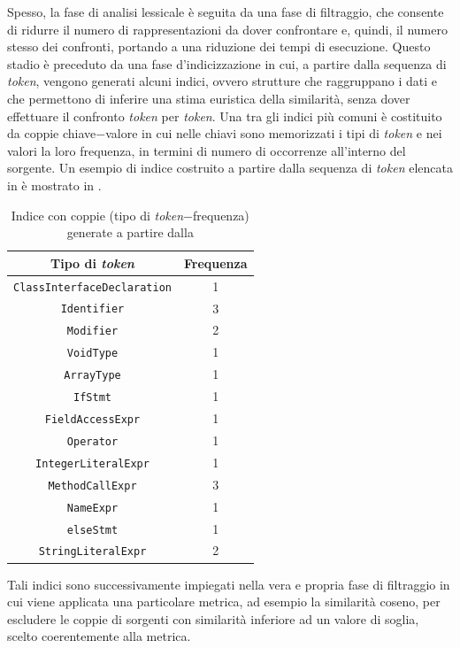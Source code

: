 Spesso, la fase di analisi lessicale è seguita da una fase di filtraggio, che consente di ridurre il numero di rappresentazioni da dover confrontare e, quindi, il numero stesso dei confronti, portando a una riduzione dei tempi di esecuzione.
%
Questo stadio è preceduto da una fase d'indicizzazione in cui, a partire dalla sequenza di \textit{token}, vengono generati alcuni indici, ovvero strutture che raggruppano i dati e che permettono di inferire una stima euristica della similarità, senza dover effettuare il confronto \textit{token} per \textit{token}.
%
Una tra gli indici più comuni è costituito da coppie chiave$-$valore in cui nelle chiavi sono memorizzati i tipi di \textit{token} e nei valori la loro frequenza, in termini di numero di occorrenze all'interno del sorgente.
%
Un esempio di indice costruito a partire dalla sequenza di \textit{token} elencata in  è mostrato in .
%
\begin{table}[h!]
    \centering
    \begin{tabular}{|c|c|} 
        \hline
        \textbf{Tipo di \textit{token}} & \textbf{Frequenza} \\ [0.5ex] 
        \hline\hline
        \texttt{ClassInterfaceDeclaration}  & 1 \\ \hline
        \texttt{Identifier}                 & 3 \\ \hline
        \texttt{Modifier}                   & 2 \\ \hline
        \texttt{VoidType}                   & 1 \\ \hline
        \texttt{ArrayType}                  & 1 \\ \hline
        \texttt{IfStmt}                     & 1 \\ \hline
        \texttt{FieldAccessExpr}            & 1 \\ \hline
        \texttt{Operator}                   & 1 \\ \hline
        \texttt{IntegerLiteralExpr}         & 1 \\ \hline
        \texttt{MethodCallExpr}             & 3 \\ \hline
        \texttt{NameExpr}                   & 1 \\ \hline
        \texttt{elseStmt}                   & 1 \\ \hline
        \texttt{StringLiteralExpr}          & 2 \\ \hline
    \end{tabular}
    \caption{Indice con coppie (tipo di \textit{token}$-$frequenza) generate a partire dalla }
    \label{table:token-indexing}
\end{table}
%
Tali indici sono successivamente impiegati nella vera e propria fase di filtraggio in cui viene applicata una particolare metrica, ad esempio la similarità coseno, per escludere le coppie di sorgenti con similarità inferiore ad un valore di soglia, scelto coerentemente alla metrica.

